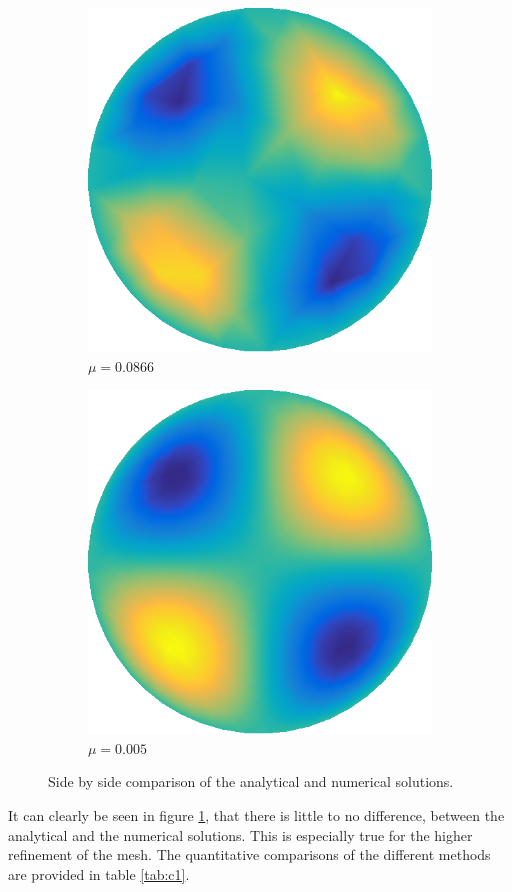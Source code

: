 \documentclass[../fem.tex]{subfile}
\begin{document}
\begin{figure}[htpb]
\begin{subfigure}{0.4\textwidth}
    \centering
    \includegraphics[width=0.8\linewidth]{figures/c3/approx.png}
    \caption{$\mu=0.0866$}
  \end{subfigure}
  \begin{subfigure}{0.4\textwidth}
    \centering
    \includegraphics[width=0.8\linewidth]{figures/c4/approx.png}
    \caption{$\mu=0.005$}
  \end{subfigure}
  \caption{Side by side comparison of the analytical and numerical solutions.}
  \label{fig:d1_soln}
\end{figure}

It can clearly be seen in figure \ref{fig:d1_soln}, that there is little to no
difference, between the analytical and the numerical solutions. This is
especially true for the higher refinement of the mesh. The quantitative
comparisons of the different methods are provided in table
\ref{tab:c1}.
\end{document}

